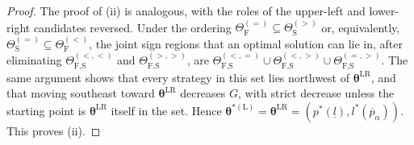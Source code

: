 \documentclass[10pt,a4paper]{amsart}
\begin{document}
\begin{proof}
The proof of (ii) is analogous, with the roles of the upper-left and lower-right candidates reversed. Under the ordering $\Theta_{\text{F}}^{\left(=\right)}\subseteq\Theta_{\text{S}}^{\left(>\right)}$ or, equivalently, $\Theta_{\text{S}}^{\left(=\right)}\subseteq\Theta_{\text{F}}^{\left(<\right)}$, the joint sign regions that an optimal solution can lie in, after eliminating $\Theta_{\text{F,S}}^{\left(<,<\right)}$ and $\Theta_{\text{F,S}}^{\left(>,>\right)}$, are $\Theta_{\text{F,S}}^{\left(<,=\right)}\cup\Theta_{\text{F,S}}^{\left(<,>\right)}\cup\Theta_{\text{F,S}}^{\left(=,>\right)}$. The same argument shows that every strategy in this set lies northwest of ${\bm\theta}^{\text{LR}}$, and that moving southeast toward ${\bm\theta}^{\text{LR}}$ decreases $G$, with strict decrease unless the starting point is ${\bm\theta}^{\text{LR}}$ itself in the set. Hence ${\bm\theta}^{*\left(\text{L}\right)}={\bm\theta}^{\text{LR}}=\left(p^*\left(\underline{l}\right),l^*\left(\overline{p}_{\alpha}\right)\right)$. This proves (ii).
\end{proof}
\end{document}
